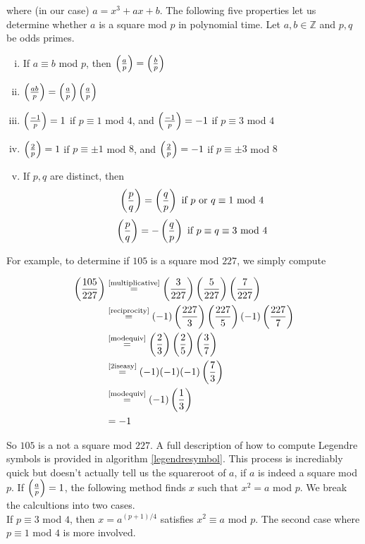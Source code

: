 where (in our case) $a = x^3 + ax + b$. The following five properties let us determine whether $a$ is a square mod $p$ in polynomial time. Let $a,b \in \mathbb{Z}$ and $p,q$ be odds primes.

\begin{enumerate}[(i)]
	\item \label{modequiv} If $a \equiv b$ mod $p$, then $\left(\frac{a}{p}\right) = \left(\frac{b}{p}\right)$
	\item \label{multiplicative} $\left(\frac{ab}{p}\right) = \left(\frac{a}{p}\right) \left(\frac{a}{p}\right) $
	\item \label{1iseasy} $\left(\frac{-1}{p}\right) = 1$ if $p \equiv 1 $ mod $4$, and $\left(\frac{-1}{p}\right) = -1$ if $p \equiv 3 $ mod $4$
	\item \label{2iseasy} $\left(\frac{2}{p}\right) = 1$ if $p \equiv \pm 1 $ mod $8$, and $\left(\frac{2}{p}\right) = -1$ if $p \equiv \pm 3 $ mod $8$
	\item \label{reciprocity} If $p,q$ are distinct, then 
		$$ 
			\left(\frac{p}{q}\right) = \left(\frac{q}{p}\right) \text { if } p \text { or } q \equiv 1 \text{ mod } 4
		$$ 
		$$  
			\left(\frac{p}{q}\right) = - \left(\frac{q}{p}\right) \text { if } p \equiv q \equiv 3 \text{ mod } 4
		$$
\end{enumerate}

For example, to determine if $105$ is a square mod $227$, we simply compute 

\begin{align*}
	\left(\frac{105}{227}\right) &\stackrel{\text{\eqref{multiplicative}}}{=} \left(\frac{3}{227}\right)\left(\frac{5}{227}\right)\left(\frac{7}{227}\right) \\
	&\stackrel{\text{\eqref{reciprocity}}}{=} (-1) \left(\frac{227}{3}\right)\left(\frac{227}{5}\right) (-1) \left(\frac{227}{7}\right) \\
	&\stackrel{\text{\eqref{modequiv}}}{=} \left(\frac{2}{3}\right)\left(\frac{2}{5}\right)\left(\frac{3}{7}\right) \\
	&\stackrel{\text{\eqref{2iseasy}}}{=} (-1)(-1)(-1) \left(\frac{7}{3}\right) \\
	&\stackrel{\text{\eqref{modequiv}}}{=} (-1) \left(\frac{1}{3}\right) \\
	&= -1 
\end{align*}

So $105$ is a not a square mod $227$. A full description of how to compute Legendre symbols is provided in algorithm  \ref{legendresymbol}. This process is incrediably quick but doesn't actually tell us the squareroot of $a$, if $a$ is indeed a square mod $p$. If $\left(\frac{a}{p}\right) = 1 $, the following method finds $x$ such that $x^2 = a$ mod $p$. We break the calcultions into two cases. \\

If $p \equiv 3 $ mod $4$, then $x = a^{(p+1)/4}$ satisfies $x^2 \equiv a $ mod $p$. The second case where $p \equiv 1 $ mod $4$ is more involved.

